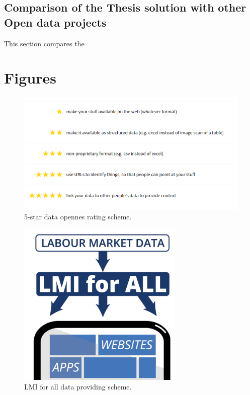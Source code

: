 \documentclass[thesis=B,english]{FITthesis}[2012/06/26]
\begin{document}
{	\section{Comparison of the Thesis solution with other Open data projects}
	This section compares the
\begin{conclusion}
\end{conclusion}

\chapter{Figures}
\begin{figure}[H]
  \includegraphics[width=\linewidth]{pictures/5starRating.png}
  \caption{5-star data opennes rating scheme. \cite{5stardata}}
  \label{fig:5-star}
\end{figure}

\begin{figure}[H]
	\centering
	\includegraphics[scale=0.5]{pictures/LMIForAll.png}
  	\caption{LMI for all data providing scheme. \cite{lmiforall}}
  	\label{fig:LMI for all}
\end{figure}

}
\end{document}
